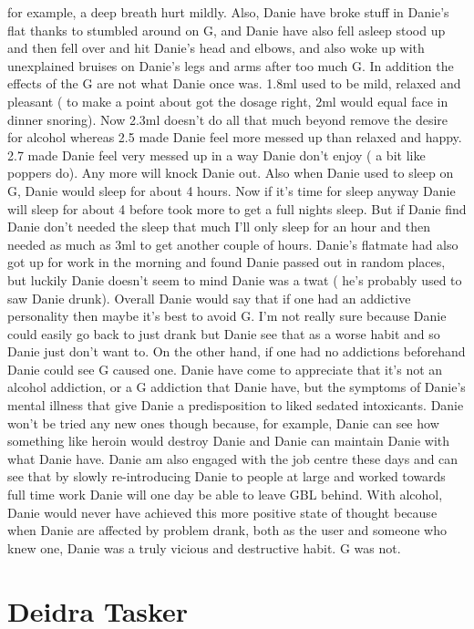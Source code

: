 \documentclass[12pt]{book}
\begin{document}
for example, a deep breath hurt mildly. Also, Danie have broke stuff in Danie's flat thanks to stumbled around on G, and Danie have also fell asleep stood up and then fell over and hit Danie's head and elbows, and also woke up with unexplained bruises on Danie's legs and arms after too much G. In addition the effects of the G are not what Danie once was. 1.8ml used to be mild, relaxed and pleasant ( to make a point about got the dosage right, 2ml would equal face in dinner snoring). Now 2.3ml doesn't do all that much beyond remove the desire for alcohol whereas 2.5 made Danie feel more messed up than relaxed and happy. 2.7 made Danie feel very messed up in a way Danie don't enjoy ( a bit like poppers do). Any more will knock Danie out. Also when Danie used to sleep on G, Danie would sleep for about 4 hours. Now if it's time for sleep anyway Danie will sleep for about 4 before took more to get a full nights sleep. But if Danie find Danie don't needed the sleep that much I'll only sleep for an hour and then needed as much as 3ml to get another couple of hours. Danie's flatmate had also got up for work in the morning and found Danie passed out in random places, but luckily Danie doesn't seem to mind Danie was a twat ( he's probably used to saw Danie drunk). Overall Danie would say that if one had an addictive personality then maybe it's best to avoid G. I'm not really sure because Danie could easily go back to just drank but Danie see that as a worse habit and so Danie just don't want to. On the other hand, if one had no addictions beforehand Danie could see G caused one. Danie have come to appreciate that it's not an alcohol addiction, or a G addiction that Danie have, but the symptoms of Danie's mental illness that give Danie a predisposition to liked sedated intoxicants. Danie won't be tried any new ones though because, for example, Danie can see how something like heroin would destroy Danie and Danie can maintain Danie with what Danie have. Danie am also engaged with the job centre these days and can see that by slowly re-introducing Danie to people at large and worked towards full time work Danie will one day be able to leave GBL behind. With alcohol, Danie would never have achieved this more positive state of thought because when Danie are affected by problem drank, both as the user and someone who knew one, Danie was a truly vicious and destructive habit. G was not.






\chapter{Deidra Tasker}
\end{document}
